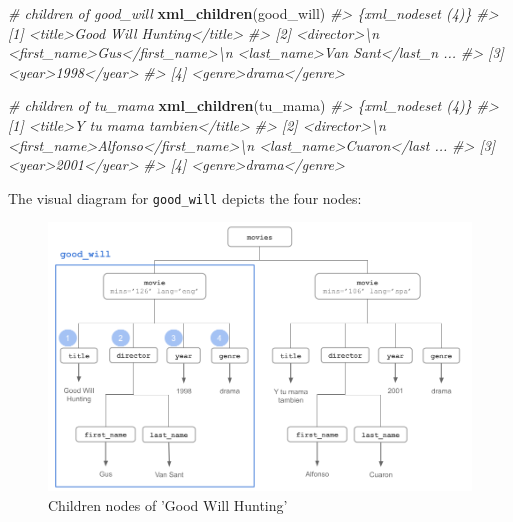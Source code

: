 \documentclass[
]{book}
\newenvironment{Shaded}{\begin{snugshade}}{\end{snugshade}}
\newcommand{\CommentTok}[1]{\textcolor[rgb]{0.56,0.35,0.01}{\textit{#1}}}
\newcommand{\FunctionTok}[1]{\textcolor[rgb]{0.13,0.29,0.53}{\textbf{#1}}}
\newcommand{\NormalTok}[1]{#1}
\begin{document}
\begin{Shaded}
\begin{Highlighting}[]
\CommentTok{\# children of good\_will}
\FunctionTok{xml\_children}\NormalTok{(good\_will)}
\CommentTok{\#\textgreater{} \{xml\_nodeset (4)\}}
\CommentTok{\#\textgreater{} [1] \textless{}title\textgreater{}Good Will Hunting\textless{}/title\textgreater{}}
\CommentTok{\#\textgreater{} [2] \textless{}director\textgreater{}\textbackslash{}n  \textless{}first\_name\textgreater{}Gus\textless{}/first\_name\textgreater{}\textbackslash{}n  \textless{}last\_name\textgreater{}Van Sant\textless{}/last\_n ...}
\CommentTok{\#\textgreater{} [3] \textless{}year\textgreater{}1998\textless{}/year\textgreater{}}
\CommentTok{\#\textgreater{} [4] \textless{}genre\textgreater{}drama\textless{}/genre\textgreater{}}
\end{Highlighting}
\end{Shaded}

\begin{Shaded}
\begin{Highlighting}[]
\CommentTok{\# children of tu\_mama}
\FunctionTok{xml\_children}\NormalTok{(tu\_mama)}
\CommentTok{\#\textgreater{} \{xml\_nodeset (4)\}}
\CommentTok{\#\textgreater{} [1] \textless{}title\textgreater{}Y tu mama tambien\textless{}/title\textgreater{}}
\CommentTok{\#\textgreater{} [2] \textless{}director\textgreater{}\textbackslash{}n  \textless{}first\_name\textgreater{}Alfonso\textless{}/first\_name\textgreater{}\textbackslash{}n  \textless{}last\_name\textgreater{}Cuaron\textless{}/last ...}
\CommentTok{\#\textgreater{} [3] \textless{}year\textgreater{}2001\textless{}/year\textgreater{}}
\CommentTok{\#\textgreater{} [4] \textless{}genre\textgreater{}drama\textless{}/genre\textgreater{}}
\end{Highlighting}
\end{Shaded}

The visual diagram for \texttt{good\_will} depicts the four nodes:

\begin{figure}

{\centering \includegraphics[width=0.85\linewidth]{images/xml/xml-movies-tree3} 

}

\caption{Children nodes of 'Good Will Hunting'}\label{fig:unnamed-chunk-39}
\end{figure}
\end{document}
